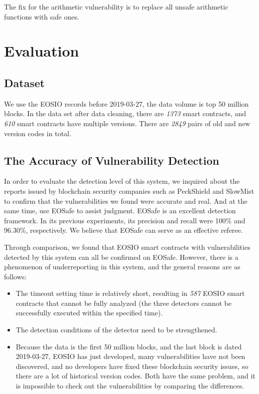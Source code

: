 \documentclass[a4paper, 10pt, conference, twocolumn]{ieeeconf}       %
\begin{document}
The fix for the arithmetic vulnerability is to replace all unsafe arithmetic functions with safe ones.

\section{Evaluation}

\subsection{Dataset}
We use the EOSIO records before 2019-03-27,
the data volume is top 50 million blocks.
In the data set after data cleaning,
there are \emph{1373} smart contracts,
and \emph{610} smart contracts have multiple versions.
There are \emph{2849} pairs of old and new version codes in total.

\subsection{The Accuracy of Vulnerability Detection}
In order to evaluate the detection level of this system,
we inquired about the reports issued by blockchain security companies such as PeckShield\cite{peckshield:2020} and SlowMist\cite{slowmist:2020} to confirm that the vulnerabilities we found were accurate and real.
And at the same time, use EOSafe to assist judgment. EOSafe is an excellent detection framework.
In its previous experiments,
its precision and recall were 100\% and 96.30\%,
respectively. We believe that EOSafe can serve as an effective referee.

Through comparison,
we found that EOSIO smart contracts with vulnerabilities detected by this system can all be confirmed on EOSafe.
However, there is a phenomenon of underreporting in this system,
and the general reasons are as follows:
\begin{itemize}
    \item The timeout setting time is relatively short, resulting in \emph{587} EOSIO smart contracts that cannot be fully analyzed (the three detectors cannot be successfully executed within the specified time).
    \item The detection conditions of the detector need to be strengthened.
    \item Because the data is the first 50 million blocks, and the last block is dated 2019-03-27, EOSIO has just developed, many vulnerabilities have not been discovered, and no developers have fixed these blockchain security issues, so there are a lot of historical version codes. Both have the same problem, and it is impossible to check out the vulnerabilities by comparing the differences.
\end{itemize}
\end{document}
